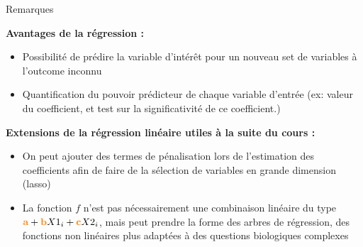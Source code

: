 	\begin{frame}{Remarques}

    	\textbf{Avantages de la régression : }
    	
    	
    	\begin{itemize} \scriptsize
    	\item Possibilité de prédire la variable d'intérêt pour un nouveau set de variables à l'outcome inconnu
    	    \item Quantification du pouvoir prédicteur de chaque variable d'entrée (ex: valeur du coefficient, et test sur la significativité de ce coefficient.)
    	\end{itemize}
    	
    	
    	
    	\vspace{0.5cm}
    	
    	\textbf{Extensions de la régression linéaire utiles à la suite du cours : }
    	
    	
    	
    	\begin{itemize} \scriptsize
    	
    	\item On peut ajouter des termes de pénalisation lors de l'estimation des coefficients afin de faire de la sélection de variables en grande dimension (lasso)
    	
    	\item La fonction $f$ n'est pas nécessairement une combinaison linéaire du type $\textcolor{orange}{\textbf{a}} + \textcolor{orange}{\textbf{b}}X1_i + \textcolor{orange}{\textbf{c}}X2_i$, mais peut prendre la forme des arbres de régression, des fonctions non linéaires plus adaptées à des questions biologiques complexes

    	\end{itemize}
    	
    	
	\end{frame}